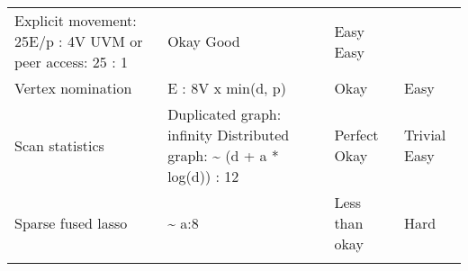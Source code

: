 \documentclass[10pt,oneside]{memoir}
\begin{document}
\begin{longtable}[]{@{}llll@{}}
\begin{minipage}[t]{0.35\columnwidth}
Explicit movement: 25E/p : 4V UVM or peer access: 25 : 1\strut
\end{minipage} & \begin{minipage}[t]{0.13\columnwidth}\raggedright
Okay Good\strut
\end{minipage} & \begin{minipage}[t]{0.13\columnwidth}\raggedright
Easy Easy\strut
\end{minipage}\tabularnewline
\begin{minipage}[t]{0.28\columnwidth}\raggedright
Vertex nomination\strut
\end{minipage} & \begin{minipage}[t]{0.35\columnwidth}\raggedright
E : 8V x min(d, p)\strut
\end{minipage} & \begin{minipage}[t]{0.13\columnwidth}\raggedright
Okay\strut
\end{minipage} & \begin{minipage}[t]{0.13\columnwidth}\raggedright
Easy\strut
\end{minipage}\tabularnewline
\begin{minipage}[t]{0.28\columnwidth}\raggedright
Scan statistics\strut
\end{minipage} & \begin{minipage}[t]{0.35\columnwidth}\raggedright
Duplicated graph: infinity Distributed graph: \textasciitilde{} (d + a *
log(d)) : 12\strut
\end{minipage} & \begin{minipage}[t]{0.13\columnwidth}\raggedright
Perfect Okay\strut
\end{minipage} & \begin{minipage}[t]{0.13\columnwidth}\raggedright
Trivial Easy\strut
\end{minipage}\tabularnewline
\begin{minipage}[t]{0.28\columnwidth}\raggedright
Sparse fused lasso\strut
\end{minipage} & \begin{minipage}[t]{0.35\columnwidth}\raggedright
\textasciitilde{} a:8\strut
\end{minipage} & \begin{minipage}[t]{0.13\columnwidth}\raggedright
Less than okay\strut
\end{minipage} & \begin{minipage}[t]{0.13\columnwidth}\raggedright
Hard\strut
\end{minipage}\tabularnewline
\begin{minipage}[t]{0.28\columnwidth}\raggedright

\end{minipage}
\end{longtable}
\end{document}

